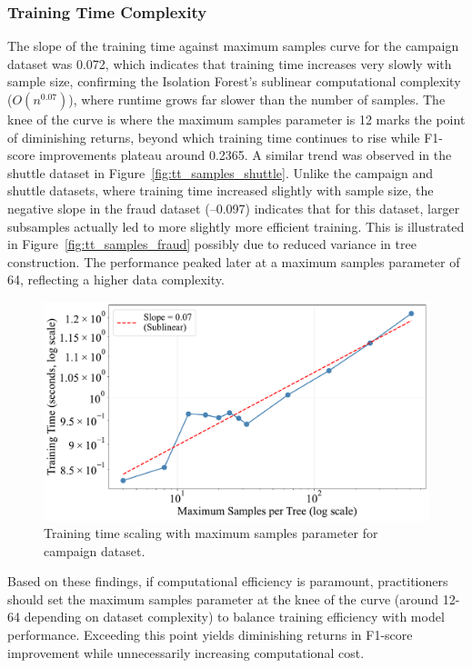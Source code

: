 \documentclass[10pt, conference]{IEEEtran}
\begin{document}
\subsubsection{Training Time Complexity}
The slope of the training time against maximum samples curve for the campaign dataset was 0.072, which indicates that training time increases very slowly with sample size, confirming the Isolation Forest’s sublinear computational complexity ($O(n^{0.07})$), where runtime grows far slower than the number of samples. The knee of the curve is where the maximum samples parameter is 12 marks the point of diminishing returns, beyond which training time continues to rise while F1-score improvements plateau around 0.2365. A similar trend was observed in the shuttle dataset in Figure~\ref{fig:tt_samples_shuttle}. Unlike the campaign and shuttle datasets, where training time increased slightly with sample size, the negative slope in the fraud dataset (–0.097) indicates that for this dataset, larger subsamples actually led to more slightly more efficient training. This is illustrated in Figure~\ref{fig:tt_samples_fraud} possibly due to reduced variance in tree construction. The performance peaked later at a maximum samples parameter of 64, reflecting a higher data complexity.
 
\begin{figure}[H]
	\centering
	\includegraphics[width=0.95\linewidth]{../results/campaign/max_samples/training_time_scaling.pdf}
	\caption{Training time scaling with maximum samples parameter for campaign dataset.}
	\label{fig:tt_samples_campaign}
\end{figure}

Based on these findings, if computational efficiency is paramount, practitioners should set the maximum samples parameter at the knee of the curve (around 12-64 depending on dataset complexity) to balance training efficiency with model performance. Exceeding this point yields diminishing returns in F1-score improvement while unnecessarily increasing computational cost.
\end{document}
